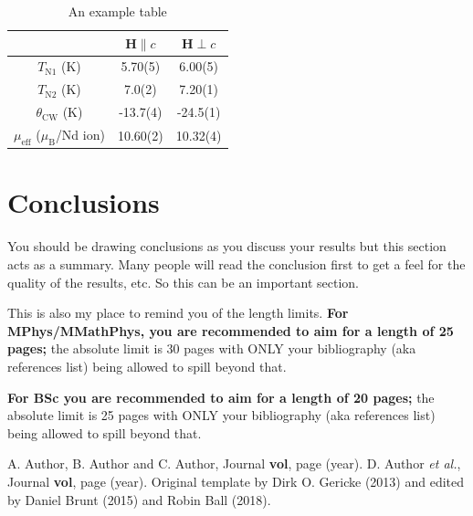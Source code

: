 \documentclass[a4paper,twocolumn,12pt, notitlepage]{article}
\begin{document}
\begin{table}[b]
\begin{tabular}{ c c c }
\hline 
 & $\mathbf{H} \parallel c$ & $\mathbf{H} \perp c$ \\ 
\hline 
$T_{\mathrm{N1}}$ (K) & 5.70(5) &  6.00(5) \\ 
$T_{\mathrm{N2}}$ (K) & 7.0(2) & 7.20(1) \\  
$\theta_{\mathrm{CW}}$ (K) & -13.7(4) & -24.5(1) \\  
$\mu_{\mathrm{eff}}$ ($\mu_{\mathrm{B}}$/Nd ion) & 10.60(2) & 10.32(4)  \\ 
\hline 
\end{tabular}
\caption{An example table}
\label{tab: tab_1}
\end{table} 


\section{Conclusions}
You should be drawing conclusions as you discuss your results but this section acts as a summary. Many people will read the conclusion first to get a feel for the quality of the results, etc. So this can be an important section.
 
This is also my place to remind you of the length limits.  {\bf For MPhys/MMathPhys, you are recommended to aim for a length of 25 pages;}  the absolute limit is 30 pages with ONLY your bibliography (aka references list) being allowed to spill beyond that. 

{\bf For BSc you are recommended to aim for a length of 20 pages;} the absolute limit is 25 pages with ONLY your bibliography (aka references list) being allowed to spill beyond that.



\small{
\begin{thebibliography}{99}

\setlength{\itemsep}{-2mm}

 A. Author, B. Author and C. Author,
                  Journal {\bf vol}, page (year).
 D. Author {\em et al.},
                  Journal {\bf vol}, page (year).
 Original template by Dirk O. Gericke (2013) and edited by Daniel Brunt (2015) and Robin Ball (2018).

\end{thebibliography}
}
\end{document}
